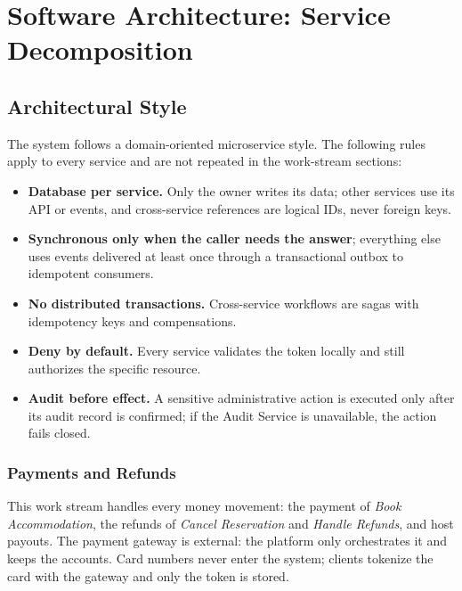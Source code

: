 \section{Software Architecture: Service Decomposition}

\subsection{Architectural Style}

The system follows a domain-oriented microservice style. The following rules
apply to every service and are not repeated in the work-stream sections:
\begin{itemize}
  \item \textbf{Database per service.} Only the owner writes its data; other
    services use its API or events, and cross-service references are logical
    IDs, never foreign keys.
  \item \textbf{Synchronous only when the caller needs the answer};
    everything else uses events delivered at least once through a
    transactional outbox to idempotent consumers.
  \item \textbf{No distributed transactions.} Cross-service workflows are
    sagas with idempotency keys and compensations.
  \item \textbf{Deny by default.} Every service validates the token locally
    and still authorizes the specific resource.
  \item \textbf{Audit before effect.} A sensitive administrative action is
    executed only after its audit record is confirmed; if the Audit Service is
    unavailable, the action fails closed.
\end{itemize}

\begingroup
\setlength{\emergencystretch}{3em}
\subsubsection{Payments and Refunds}
\label{sec:pay-style}

This work stream handles every money movement: the payment of \emph{Book
Accommodation}, the refunds of \emph{Cancel Reservation} and \emph{Handle
Refunds}, and host payouts. The payment gateway is external: the platform only
orchestrates it and keeps the accounts. Card numbers never enter the system;
clients tokenize the card with the gateway and only the token is stored.

